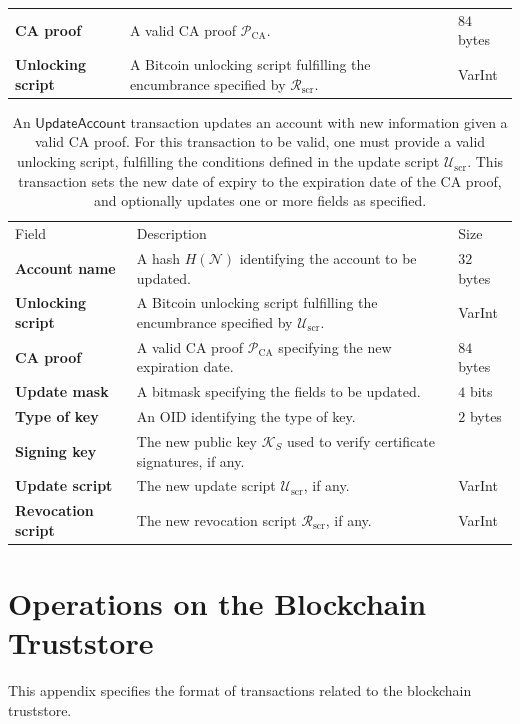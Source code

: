 \documentclass{style/kththesis}
\begin{document}
\begin{appendices}
\begin{table}[ht]
\begin{tabularx}{\textwidth}{lXl}
\textbf{CA proof} & A valid CA proof $\mathcal{P}_{\text{CA}}$. & $84$ bytes \\
\textbf{Unlocking script} & A Bitcoin unlocking script fulfilling the encumbrance specified by $\mathcal{R}_{\text{scr}}$. & VarInt
\end{tabularx}
\end{table}
\begin{table}[ht]
\caption{An $\mathsf{UpdateAccount}$ transaction updates an account with new information given a valid CA proof. For this transaction to be valid, one must provide a valid unlocking script, fulfilling the conditions defined in the update script $\mathcal{U}_{\text{scr}}$. This transaction sets the new date of expiry to the expiration date of the CA proof, and optionally updates one or more fields as specified.}
\label{tab:updateaccount}
\begin{tabularx}{\textwidth}{lXl}
\cmidrule(r){1-3}
Field & Description & Size \\ 
\cmidrule(r){1-3}
\textbf{Account name} & A hash $H(\mathcal{N})$ identifying the account to be updated. & $32$ bytes \\
\textbf{Unlocking script} & A Bitcoin unlocking script fulfilling the encumbrance specified by $\mathcal{U}_{\text{scr}}$. & VarInt \\
\textbf{CA proof} & A valid CA proof $\mathcal{P}_{\text{CA}}$ specifying the new expiration date. & $84$ bytes \\
\textbf{Update mask} & A bitmask specifying the fields to be updated. & $4$ bits \\
\textbf{Type of key} & An OID identifying the type of key. & $2$ bytes \\
\textbf{Signing key} & The new public key $\mathcal{K}_S$ used to verify certificate signatures, if any. & ~ \\
\textbf{Update script} & The new update script $\mathcal{U}_{\text{scr}}$, if any. & VarInt \\
\textbf{Revocation script} & The new revocation script $\mathcal{R}_{\text{scr}}$, if any. & VarInt
\end{tabularx}
\end{table}

\chapter{Operations on the Blockchain Truststore}
\label{app:truststore-transactions}
This appendix specifies the format of transactions related to the blockchain truststore.


\end{appendices}
\end{document}
